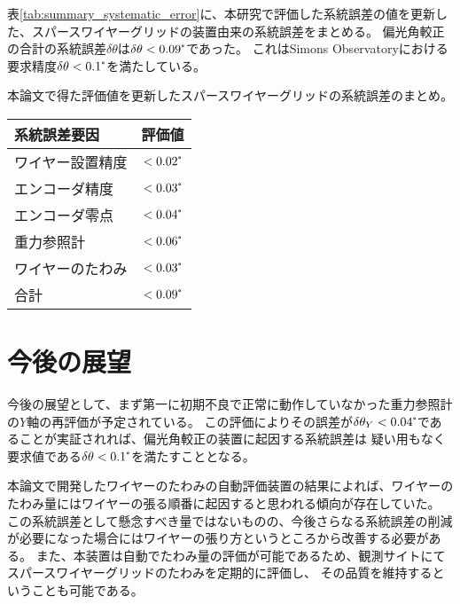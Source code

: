 \documentclass[../../main.tex]{subfiles}
\begin{document}
表\ref{tab:summary_systematic_error}に、本研究で評価した系統誤差の値を更新した、スパースワイヤーグリッドの装置由来の系統誤差をまとめる。
偏光角較正の合計の系統誤差$\delta\theta$は$\delta\theta<0.09\tcdegree$であった。
これはSimons Observatoryにおける要求精度$\delta\theta<0.1\tcdegree$を満たしている。

\begin{center}
    \begin{threeparttable}[H]
        \centering
        \caption{本論文で得た評価値を更新したスパースワイヤーグリッドの系統誤差のまとめ。}
        \begin{tabular}{lc}
            \hline\hline
            系統誤差要因 & 評価値 \\
            \hline
            ワイヤー設置精度 & $<0.02\tcdegree$ \\
            エンコーダ精度 & $<0.03\tcdegree$ \\
            エンコーダ零点 & $<0.04\tcdegree$ \\
            重力参照計\footnotemark[1]\footnotemark[2] & $<0.06\tcdegree$ \\
            ワイヤーのたわみ & $<0.03\tcdegree$ \\
            \hline
            合計 & $<0.09\tcdegree$ \\
            \hline\hline
        \end{tabular}
        \label{tab:summary_systematic_error}
    \end{threeparttable}
\end{center}

\section{今後の展望}
今後の展望として、まず第一に初期不良で正常に動作していなかった重力参照計の$Y$軸の再評価が予定されている。
この評価によりその誤差が$\delta\theta_{Y}<0.04\tcdegree$であることが実証されれば、偏光角較正の装置に起因する系統誤差は
疑い用もなく要求値である$\delta\theta<0.1\tcdegree$を満たすこととなる。

本論文で開発したワイヤーのたわみの自動評価装置の結果によれば、ワイヤーのたわみ量にはワイヤーの張る順番に起因すると思われる傾向が存在していた。
この系統誤差として懸念すべき量ではないものの、今後さらなる系統誤差の削減が必要になった場合にはワイヤーの張り方というところから改善する必要がある。
また、本装置は自動でたわみ量の評価が可能であるため、観測サイトにてスパースワイヤーグリッドのたわみを定期的に評価し、
その品質を維持するということも可能である。
\end{document}
